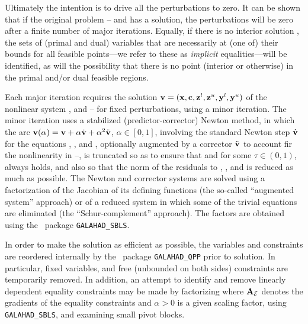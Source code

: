 \documentclass{galahad}
\begin{document}
Ultimately the intention is to drive all the perturbations to zero. 
It can be shown that if the original problem --
and 
has a solution, the perturbations will be zero after a finite number of major 
iterations. Equally, if there is no interior solution  , 
the sets of (primal and dual) variables that are necessarily at (one of) their
bounds for all feasible points---we refer to these as {\em implicit} 
equalities---will be identified, as will the possibility that there is
no point (interior or otherwise) in the primal and/or dual feasible regions.

Each major iteration requires the solution 
${\mathbf{v}} = ({\mathbf{x}},{\mathbf{c}},{\mathbf{z}}^l,{\mathbf{z}}^u,{\mathbf{y}}^l,{\mathbf{y}}^u)$
of the nonlinear system
,  and --
for fixed perturbations, using a minor iteration. The minor iteration
uses a stabilized (predictor-corrector) Newton method, 
in which the arc 
${\mathbf{v}}(\alpha) = {\mathbf{v}} + \alpha \dot{{\mathbf{v}}} + \alpha^2 \ddot{{\mathbf{v}}}$, $\alpha \in 
[0,1]$,
involving the standard Newton step $\dot{{\mathbf{v}}}$
for the equations , , 
and , optionally augmented by a corrector $\ddot{{\mathbf{v}}}$
to account fir the nonlinearity in --,
is truncated so as to ensure that
and 
for some $\tau \in (0,1)$, always holds, and also so that the norm
of the residuals to 
, ,  and 
is reduced as much as possible. 
The Newton and corrector systems are solved using a factorization of
the Jacobian of its defining functions (the so-called ``augmented system''
approach) or of a reduced system in which some of the trivial equations are
eliminated (the ``Schur-complement'' approach).
The factors are obtained using the \galahad\ package {\tt GALAHAD\_SBLS}.

In order to make the solution as efficient as possible, the 
variables and constraints are reordered internally
by the \galahad\ package {\tt GALAHAD\_QPP} prior to solution. 
In particular, fixed variables, and 
free (unbounded on both sides) constraints are temporarily removed.
In addition, an attempt to identify and remove linearly dependent
equality constraints may be made by factorizing
where $\bmA_{\cal E}$  denotes the gradients of the equality constraints and
$\alpha > 0$ is a given scaling factor,
using {\tt GALAHAD\_SBLS}, and examining small pivot blocks.
\end{document}

